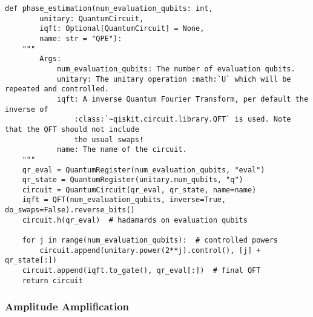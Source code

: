 \documentclass[../../main.tex]{subfiles}
\begin{document}
\begin{lstlisting}[caption={Example of phaseestimation algorithm used for results of this paper.},captionpos=b]
  def phase_estimation(num_evaluation_qubits: int,
        unitary: QuantumCircuit,
        iqft: Optional[QuantumCircuit] = None,
        name: str = "QPE"):
    """
        Args:
            num_evaluation_qubits: The number of evaluation qubits.
            unitary: The unitary operation :math:`U` which will be repeated and controlled.
            iqft: A inverse Quantum Fourier Transform, per default the inverse of
                :class:`~qiskit.circuit.library.QFT` is used. Note that the QFT should not include
                the usual swaps!
            name: The name of the circuit.
    """
    qr_eval = QuantumRegister(num_evaluation_qubits, "eval")
    qr_state = QuantumRegister(unitary.num_qubits, "q")
    circuit = QuantumCircuit(qr_eval, qr_state, name=name)
    iqft = QFT(num_evaluation_qubits, inverse=True, do_swaps=False).reverse_bits()
    circuit.h(qr_eval)  # hadamards on evaluation qubits

    for j in range(num_evaluation_qubits):  # controlled powers
        circuit.append(unitary.power(2**j).control(), [j] + qr_state[:])
    circuit.append(iqft.to_gate(), qr_eval[:])  # final QFT
    return circuit
\end{lstlisting}

\subsubsection{Amplitude Amplification}\label{sec:amplitudeAmplification}
\end{document}
